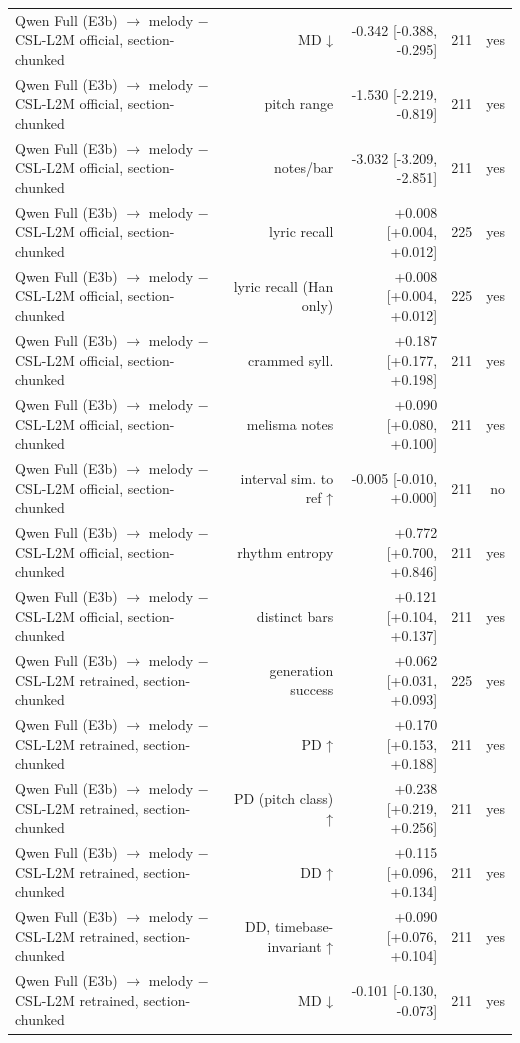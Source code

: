 \begin{table}[t]
\begin{tabular}{lrrrr}
Qwen Full (E3b) $\rightarrow$ melody $-$ CSL-L2M official, section-chunked & MD ↓ & -0.342 [-0.388, -0.295] & 211 & yes \\
Qwen Full (E3b) $\rightarrow$ melody $-$ CSL-L2M official, section-chunked & pitch range & -1.530 [-2.219, -0.819] & 211 & yes \\
Qwen Full (E3b) $\rightarrow$ melody $-$ CSL-L2M official, section-chunked & notes/bar & -3.032 [-3.209, -2.851] & 211 & yes \\
Qwen Full (E3b) $\rightarrow$ melody $-$ CSL-L2M official, section-chunked & lyric recall & +0.008 [+0.004, +0.012] & 225 & yes \\
Qwen Full (E3b) $\rightarrow$ melody $-$ CSL-L2M official, section-chunked & lyric recall (Han only) & +0.008 [+0.004, +0.012] & 225 & yes \\
Qwen Full (E3b) $\rightarrow$ melody $-$ CSL-L2M official, section-chunked & crammed syll. & +0.187 [+0.177, +0.198] & 211 & yes \\
Qwen Full (E3b) $\rightarrow$ melody $-$ CSL-L2M official, section-chunked & melisma notes & +0.090 [+0.080, +0.100] & 211 & yes \\
Qwen Full (E3b) $\rightarrow$ melody $-$ CSL-L2M official, section-chunked & interval sim. to ref ↑ & -0.005 [-0.010, +0.000] & 211 & no \\
Qwen Full (E3b) $\rightarrow$ melody $-$ CSL-L2M official, section-chunked & rhythm entropy & +0.772 [+0.700, +0.846] & 211 & yes \\
Qwen Full (E3b) $\rightarrow$ melody $-$ CSL-L2M official, section-chunked & distinct bars & +0.121 [+0.104, +0.137] & 211 & yes \\
Qwen Full (E3b) $\rightarrow$ melody $-$ CSL-L2M retrained, section-chunked & generation success & +0.062 [+0.031, +0.093] & 225 & yes \\
Qwen Full (E3b) $\rightarrow$ melody $-$ CSL-L2M retrained, section-chunked & PD ↑ & +0.170 [+0.153, +0.188] & 211 & yes \\
Qwen Full (E3b) $\rightarrow$ melody $-$ CSL-L2M retrained, section-chunked & PD (pitch class) ↑ & +0.238 [+0.219, +0.256] & 211 & yes \\
Qwen Full (E3b) $\rightarrow$ melody $-$ CSL-L2M retrained, section-chunked & DD ↑ & +0.115 [+0.096, +0.134] & 211 & yes \\
Qwen Full (E3b) $\rightarrow$ melody $-$ CSL-L2M retrained, section-chunked & DD, timebase-invariant ↑ & +0.090 [+0.076, +0.104] & 211 & yes \\
Qwen Full (E3b) $\rightarrow$ melody $-$ CSL-L2M retrained, section-chunked & MD ↓ & -0.101 [-0.130, -0.073] & 211 & yes \\

\end{tabular}
\end{table}
